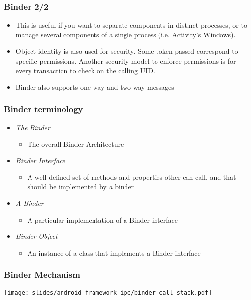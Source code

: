 \begin{frame}
  \frametitle{Binder 2/2}
  \begin{itemize}
  \item This is useful if you want to separate components in distinct
    processes, or to manage several components of a single process (i.e.
    Activity's Windows).
  \item Object identity is also used for security. Some
    token passed correspond to specific permissions. Another
    security model to enforce permissions is for every transaction to
    check on the calling UID.
  \item Binder also supports one-way and two-way messages 
  \end{itemize}
\end{frame}

\begin{frame}
  \frametitle{Binder terminology}
  \begin{itemize}
  \item \emph{The Binder}
    \begin{itemize}
    \item The overall Binder Architecture
    \end{itemize}
  \item \emph{Binder Interface}
    \begin{itemize}
    \item A well-defined set of methods and properties other can call,
      and that should be implemented by \emph{a} binder
    \end{itemize}
  \item \emph{A Binder}
    \begin{itemize}
    \item A particular implementation of a Binder interface
    \end{itemize}
  \item \emph{Binder Object}
    \begin{itemize}
    \item An instance of a class that implements a Binder interface
    \end{itemize}
  \end{itemize}
\end{frame}

\begin{frame}
  \frametitle{Binder Mechanism}
  \begin{center}
    \texttt{[image: slides/android-framework-ipc/binder-call-stack.pdf]}
  \end{center}
\end{frame}

